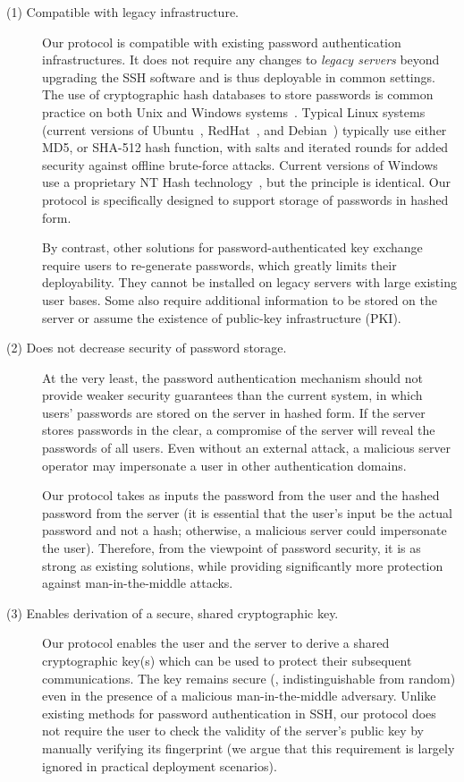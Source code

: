 \begin{description}

\item[(1) Compatible with legacy infrastructure.] 
Our protocol is compatible with existing password authentication
infrastructures.  It does not require any changes to \emph{legacy servers}
beyond upgrading the SSH software and is thus deployable in common
settings.  The use of cryptographic hash databases to store passwords is
common practice on both Unix and Windows systems~\cite{smith08}. Typical
Linux systems (current versions of Ubuntu~\cite{ubuntu-shadow},
RedHat~\cite{redhat-shadow}, and Debian~\cite{debian-shadow}) typically
use either MD5, or SHA-512 hash function, with salts and iterated rounds
for added security against offline brute-force attacks.  Current versions
of Windows use a proprietary NT Hash technology~\cite{nt-hash}, but
the principle is identical.  Our protocol is specifically designed to
support storage of passwords in hashed form.

By contrast, other solutions for password-authenticated key exchange
require users to re-generate passwords, which greatly limits their
deployability.  They cannot be installed on legacy servers with large
existing user bases.  Some also require additional information to be
stored on the server or assume the existence of public-key infrastructure
(PKI).

\item[(2) Does not decrease security of password storage.] 
At the very least, the password authentication mechanism should not
provide weaker security guarantees than the current system, in which
users' passwords are stored on the server in hashed form.  If the server
stores passwords in the clear, a compromise of the server will reveal
the passwords of all users.  Even without an external attack, a malicious
server operator may impersonate a user in other authentication domains.

Our protocol takes as inputs the password from the user and the hashed
password from the server (it is essential that the user's input be the
actual password and not a hash; otherwise, a malicious server could
impersonate the user).  Therefore, from the viewpoint of password
security, it is as strong as existing solutions, while providing
significantly more protection against man-in-the-middle attacks.

\item[(3) Enables derivation of a secure, shared cryptographic key.]
Our protocol enables the user and the server to derive a shared
cryptographic key(s) which can be used to protect their subsequent
communications.  The key remains secure (\ie, indistinguishable from
random) even in the presence of a malicious man-in-the-middle
adversary.  Unlike existing methods for password authentication in
SSH, our protocol does not require the user to check the validity of
the server's public key by manually verifying its fingerprint (we
argue that this requirement is largely ignored in practical deployment
scenarios).


\end{description}
